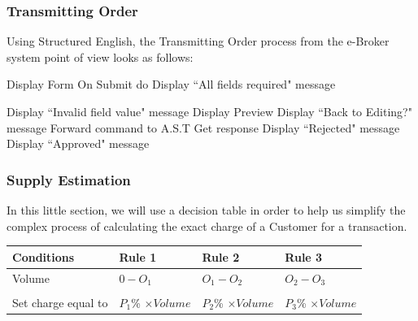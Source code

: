 \documentclass{article}
\begin{document}
\subsubsection{Transmitting Order}
Using Structured English, the Transmitting Order process from the e-Broker system point of view looks as follows:\\
\begin{algorithmic}[H]
  	\STATE Display Form
  	\STATE On Submit do
  		\STATE Display ``All fields required" message
   
  		\STATE Display ``Invalid field value" message
  	\ELSE
  		\STATE Display Preview
  		\STATE Display ``Back to Editing?" message
  	\ENDIF
 \ENDWHILE
 \STATE Forward command to A.S.T
 \STATE Get response
  	\STATE Display ``Rejected" message
 \ELSE
  	\STATE Display ``Approved" message
 \ENDIF

\end{algorithmic}

\subsubsection{Supply Estimation}
In this little section, we will use a decision table in order to help us simplify the complex process of calculating the exact charge of a Customer for a transaction.
\begin{table}[htbp]
\begin{tabular}{|l|l|l|l|}
\hline
\rowcolor[HTML]{EFEFEF} 
\textbf{Conditions} & Rule 1               & Rule 2               & Rule 3               \\ \hline
Volume              & $0 - O_1$            & $O_1-O_2$            & $O_2-O_3$            \\ \hline
\rowcolor[HTML]{EFEFEF} 
\multicolumn{4}{|l|}{\cellcolor[HTML]{EFEFEF}\textbf{Actions}}                           \\ \hline
Set charge equal to & $P_1$\% $\times Volume$ & $P_2$\% $\times Volume$ & $P_3$\% $\times Volume$ \\ \hline
\end{tabular}
\end{table}
\end{document}

